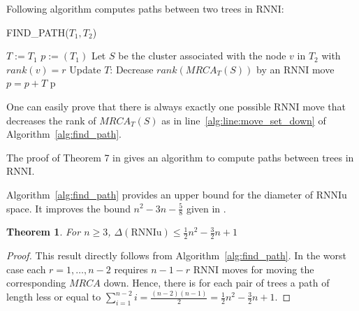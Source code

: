 \documentclass[11pt, a4paper]{article}
\newcommand{\rnni}{\mathrm{RNNI}}
\newcommand{\rnniu}{\mathrm{RNNIu}}
\newtheorem{theorem}[definition]{Theorem}
\begin{document}
Following algorithm computes paths between two trees in $\rnni$:

\begin{algorithm}[H]
\caption{FIND\_PATH($T_1,T_2$)}
\label{alg:find_path}
\begin{algorithmic}[1]
	\STATE $T := T_1$
	\STATE $p := (T_1)$
		\STATE Let $S$ be the cluster associated with the node $v$ in $T_2$ with $rank(v) = r$
			\STATE Update $T$: Decrease $rank(MRCA_T(S))$ by an $\rnni$ move \label{alg:line:move_set_down}
			\STATE $p = p+T$
		\ENDWHILE
	\ENDFOR
	\RETURN p
\end{algorithmic}
\end{algorithm}

One can easily prove that there is always exactly one possible $\rnni$ move that decreases the rank of $MRCA_T(S)$ as in line~\ref{alg:line:move_set_down} of Algorithm~\ref{alg:find_path}.

The proof of Theorem 7 in \cite{Gavryushkin2017} gives an algorithm to compute paths between trees in $\rnni$.



Algorithm~\ref{alg:find_path} provides an upper bound for the diameter of $\rnniu$ space.
It improves the bound $n^2 - 3n - \frac{5}{8}$ given in \cite{Gavryushkin2017}.

\begin{theorem}
	For $n \geq 3$, $\Delta(\rnniu) \leq \frac{1}{2}n^2-\frac{3}{2}n+1$
\end{theorem}

\begin{proof}
	This result directly follows from Algorithm~\ref{alg:find_path}.
	In the worst case each $r = 1, \dots, n-2$ requires $n-1-r$ $\rnni$ moves for moving the corresponding $MRCA$ down.
	Hence, there is for each pair of trees a path of length less or equal to $\sum\limits_{i = 1}^{n-2} i = \frac{(n-2)(n-1)}{2} = \frac{1}{2}n^2-\frac{3}{2}n+1$.
\end{proof}

\end{document}
